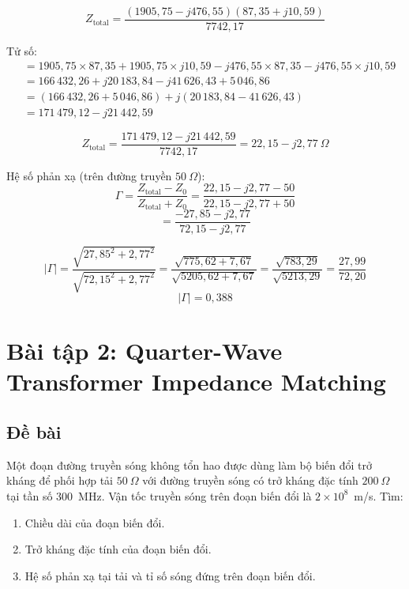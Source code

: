 \documentclass[12pt,a4paper]{article}
\begin{document}
\[
Z_{\text{total}} = \frac{(1905{,}75 - j476{,}55)(87{,}35 + j10{,}59)}{7742{,}17}
\]

Tử số:
\begin{align*}
&= 1905{,}75 \times 87{,}35 + 1905{,}75 \times j10{,}59 - j476{,}55 \times 87{,}35 - j476{,}55 \times j10{,}59 \\
&= 166\,432{,}26 + j20\,183{,}84 - j41\,626{,}43 + 5\,046{,}86 \\
&= (166\,432{,}26 + 5\,046{,}86) + j(20\,183{,}84 - 41\,626{,}43) \\
&= 171\,479{,}12 - j21\,442{,}59
\end{align*}

\[
Z_{\text{total}} = \frac{171\,479{,}12 - j21\,442{,}59}{7742{,}17} = 22{,}15 - j2{,}77~\Omega
\]

Hệ số phản xạ (trên đường truyền $50~\Omega$):
\[
\Gamma = \frac{Z_{\text{total}} - Z_0}{Z_{\text{total}} + Z_0} = \frac{22{,}15 - j2{,}77 - 50}{22{,}15 - j2{,}77 + 50}
\]
\[
= \frac{-27{,}85 - j2{,}77}{72{,}15 - j2{,}77}
\]

\[
|\Gamma| = \frac{\sqrt{27{,}85^2 + 2{,}77^2}}{\sqrt{72{,}15^2 + 2{,}77^2}} = \frac{\sqrt{775{,}62 + 7{,}67}}{\sqrt{5205{,}62 + 7{,}67}} = \frac{\sqrt{783{,}29}}{\sqrt{5213{,}29}} = \frac{27{,}99}{72{,}20}
\]
\[
\boxed{|\Gamma| = 0{,}388}
\]

\newpage
\section{Bài tập 2: Quarter-Wave Transformer Impedance Matching}

\subsection{Đề bài}
Một đoạn đường truyền sóng không tổn hao được dùng làm bộ biến đổi trở kháng để phối hợp tải $50~\Omega$ với đường truyền sóng có trở kháng đặc tính $200~\Omega$ tại tần số $300$~MHz. Vận tốc truyền sóng trên đoạn biến đổi là $2 \times 10^8$~m/s. Tìm:
\begin{enumerate}
    \item[(a)] Chiều dài của đoạn biến đổi.
    \item[(b)] Trở kháng đặc tính của đoạn biến đổi.
    \item[(c)] Hệ số phản xạ tại tải và tỉ số sóng đứng trên đoạn biến đổi.
\end{enumerate}
\end{document}
